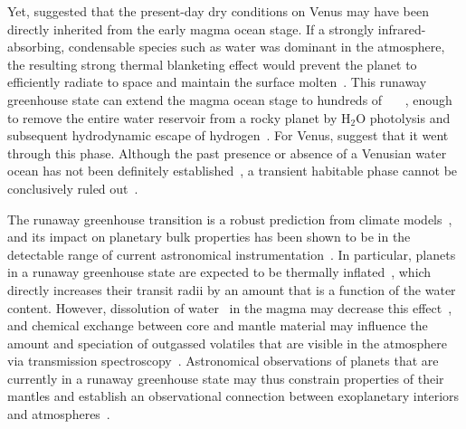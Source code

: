 \documentclass[twocolumn,twocolappendix,linenumbers]{aastex631}
\begin{document}
Yet, \citet{Hamano2013} suggested that the present-day dry conditions on Venus may have been directly inherited from the early magma ocean stage.%
If a strongly infrared-absorbing, condensable species such as water was dominant in the atmosphere, the resulting strong thermal blanketing effect would prevent the planet to efficiently radiate to space and maintain the surface molten~\citep{Ingersoll1969,Kasting1988,2010ppc..book.....P,Goldblatt2013,2015ExA....40..449L,2017JGRE..122.1458S}.
This runaway greenhouse state can extend the magma ocean stage to hundreds of \SI{}{\mega\year}~\citep{2016ApJ...829...63S,2021AsBio..21.1325B}, enough to remove the entire water reservoir from a rocky planet by H$_2$O photolysis and subsequent hydrodynamic escape of hydrogen~\citep{2013ApJ...778..154W,2014ApJ...785L..20W,Luger2015}.
For Venus,  suggest that it went through this phase.
Although the past presence or absence of a Venusian water ocean has not been definitely established~\citep{Raymond2006,Raymond2007,Hamano2013,Way2016,2019JGRE..124.2015K,2021JGRE..12606643K,Turbet2021,2023PNAS..12009751W}, a transient habitable phase cannot be conclusively ruled out~\citep[e.g.,][]{Way2016,Salvador2017,Krissansen-Totton2021}.

The runaway greenhouse transition is a robust prediction from climate models~\citep{Kasting1988,Nakajima1992,Goldblatt2012,Forget2014,Boukrouche2021,2022A&A...658A..40C}, and its impact on planetary bulk properties has been shown to be in the detectable range of current astronomical instrumentation~\citep{Goldblatt2015}.
In particular, planets in a runaway greenhouse state are expected to be thermally inflated~\citep{Turbet2019,Turbet2020,Mousis2020}, which directly increases their transit radii by an amount that is a function of the water content.
However, dissolution of water~\citep[e.g.,][]{Elkins-Tanton2008,Hier-Majumder2017,Salvador2023} in the magma may decrease this effect~\citep{Dorn2021}, and chemical exchange between core and mantle material may influence the amount and speciation of outgassed volatiles that are visible in the atmosphere via transmission spectroscopy~\citep{2021ApJ...914L...4L,Schlichting2022}.
Astronomical observations of planets that are currently in a runaway greenhouse state may thus constrain properties of their mantles and establish an observational connection between exoplanetary interiors and atmospheres~\citep{Lichtenberg2022,Wordsworth2022}.
\end{document}
